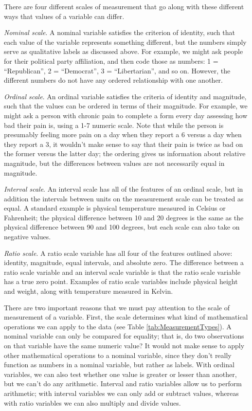 \documentclass[12pt,]{book}
\theoremstyle{definition}
\theoremstyle{definition}
\theoremstyle{definition}
\theoremstyle{remark}
\begin{document}
There are four different scales of measurement that go along with these different ways that values of a variable can differ.

\emph{Nominal scale}. A nominal variable satisfies the criterion of identity, such that each value of the variable represents something different, but the numbers simply serve as qualitative labels as discussed above. For example, we might ask people for their political party affiliation, and then code those as numbers: 1 = ``Republican'', 2 = ``Democrat'', 3 = ``Libertarian'', and so on. However, the different numbers do not have any ordered relationship with one another.

\emph{Ordinal scale}. An ordinal variable satisfies the criteria of identity and magnitude, such that the values can be ordered in terms of their magnitude. For example, we might ask a person with chronic pain to complete a form every day assessing how bad their pain is, using a 1-7 numeric scale. Note that while the person is presumably feeling more pain on a day when they report a 6 versus a day when they report a 3, it wouldn't make sense to say that their pain is twice as bad on the former versus the latter day; the ordering gives us information about relative magnitude, but the differences between values are not necessarily equal in magnitude.

\emph{Interval scale}. An interval scale has all of the features of an ordinal scale, but in addition the intervals between units on the measurement scale can be treated as equal. A standard example is physical temperature measured in Celsius or Fahrenheit; the physical difference between 10 and 20 degrees is the same as the physical difference between 90 and 100 degrees, but each scale can also take on negative values.

\emph{Ratio scale}. A ratio scale variable has all four of the features outlined above: identity, magnitude, equal intervals, and absolute zero. The difference between a ratio scale variable and an interval scale variable is that the ratio scale variable has a true zero point. Examples of ratio scale variables include physical height and weight, along with temperature measured in Kelvin.

There are two important reasons that we must pay attention to the scale of measurement of a variable. First, the scale determines what kind of mathematical operations we can apply to the data (see Table \ref{tab:MeasurementTypes}). A nominal variable can only be compared for equality; that is, do two observations on that variable have the same numeric value? It would not make sense to apply other mathematical operations to a nominal variable, since they don't really function as numbers in a nominal variable, but rather as labels. With ordinal variables, we can also test whether one value is greater or lesser than another, but we can't do any arithmetic. Interval and ratio variables allow us to perform arithmetic; with interval variables we can only add or subtract values, whereas with ratio variables we can also multiply and divide values.
\end{document}
